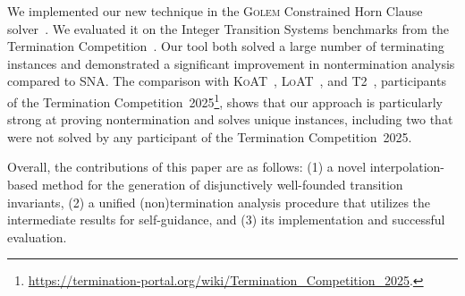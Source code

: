 We implemented our new technique in the \textsc{Golem} Constrained Horn Clause solver~\cite{DBLP:conf/cav/BlichaBS23}. 
We evaluated it on the Integer Transition Systems benchmarks from the Termination Competition~\cite{DBLP:conf/cade/GieslMRTW15}. 
Our tool both solved a large number of terminating instances and demonstrated a significant improvement in
nontermination analysis compared to SNA.
The comparison with \textsc{KoAT}~\cite{DBLP:journals/toplas/BrockschmidtEFFG16}, \textsc{LoAT}~\cite{DBLP:conf/cade/FrohnG22}, and \textsc{T2}~\cite{DBLP:conf/tacas/BrockschmidtCIK16},
participants of the Termination Competition~2025\footnote{\url{https://termination-portal.org/wiki/Termination_Competition_2025}.},
shows that our approach is particularly strong at proving nontermination and solves unique instances, including two
that were not solved by any participant of the Termination Competition~2025.

Overall, the contributions of this paper are as follows: (1) a novel interpolation-based method for the generation of 
disjunctively well-founded transition invariants, (2) a unified (non)termination analysis procedure that utilizes
the intermediate results for self-guidance, and (3) its
implementation and successful evaluation.

